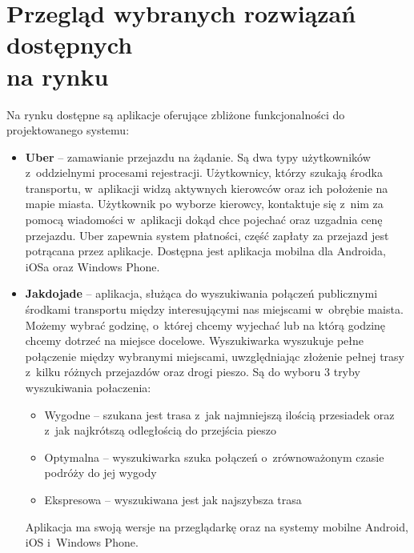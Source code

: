 \documentclass[eng,archivemode]{mgr}
\begin{document}
\section[Przegląd wybranych rozwiązań dostępnych na rynku]{Przegląd wybranych rozwiązań dostępnych\\ na rynku}
Na rynku dostępne są aplikacje oferujące zbliżone funkcjonalności do projektowanego systemu:
\begin{itemize}
	\item \textbf{Uber }-- zamawianie przejazdu na żądanie. Są dwa typy użytkowników z~oddzielnymi procesami rejestracji. Użytkownicy, którzy szukają środka transportu, w~aplikacji widzą aktywnych kierowców oraz ich położenie na mapie miasta. Użytkownik po wyborze kierowcy, kontaktuje się z~nim za pomocą wiadomości w~aplikacji dokąd chce pojechać oraz uzgadnia cenę przejazdu. Uber zapewnia system płatności, część zapłaty za przejazd jest potrącana przez aplikacje. Dostępna jest aplikacja mobilna dla Androida, iOSa oraz Windows Phone.
	\item \textbf{Jakdojade }-- aplikacja, służąca do wyszukiwania połączeń publicznymi środkami transportu między interesującymi nas miejscami w~obrębie maista. Możemy wybrać godzinę, o~której chcemy wyjechać lub na którą godzinę chcemy dotrzeć na miejsce docelowe. Wyszukiwarka wyszukuje pełne połączenie między wybranymi miejscami, uwzględniając złożenie pełnej trasy z~kilku różnych przejazdów oraz drogi pieszo. Są do wyboru 3 tryby wyszukiwania połaczenia:
	\begin{itemize}
		\item Wygodne – szukana jest trasa z~jak najmniejszą ilością przesiadek oraz z~jak najkrótszą odległością do przejścia pieszo
		\item Optymalna – wyszukiwarka szuka połączeń o~zrównoważonym czasie podróży do jej wygody
		\item Ekspresowa – wyszukiwana jest jak najszybsza trasa
	\end{itemize}
	Aplikacja ma swoją wersje na przeglądarkę oraz na systemy mobilne Android, iOS i~Windows Phone.
	

\end{itemize}
\end{document}
